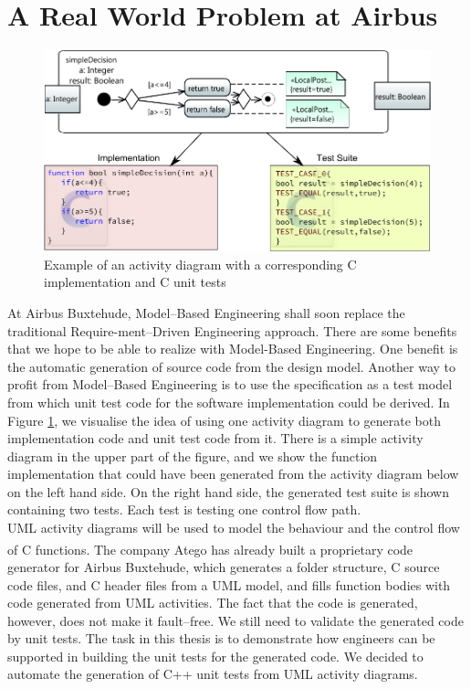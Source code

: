 \section{A Real World Problem at Airbus}
\begin{figure}
\label{fig:Act2Code+Tests}
\includegraphics[width=\textwidth]{./pics/BasicExamplesSimpleDecision.pdf}
\caption{Example of an activity diagram with a corresponding C implementation and C unit tests}
\end{figure}
At Airbus Buxtehude, Model--Based Engineering shall soon replace the traditional Require-ment--Driven Engineering approach. There are some benefits that we hope to be able to realize with Model-Based Engineering. One benefit is the automatic generation of source code from the design model. Another way to profit from Model--Based Engineering is to use the specification as a test model from which unit test code for the software implementation could be derived. In Figure \ref{fig:Act2Code+Tests}, we visualise the idea of using one activity diagram to generate both implementation code and unit test code from it. There is a simple activity diagram in the upper part of the figure, and we show the function implementation that could have been generated from the activity diagram below on the left hand side. On the right hand side, the generated test suite is shown containing two tests. Each test is testing one control flow path.\\
UML activity diagrams will be used to model the behaviour and the control flow of C functions. The company Atego\textsuperscript{\textregistered} has already built a proprietary code generator for Airbus Buxtehude, which generates a folder structure, C source code files, and C header files from a UML model, and fills function bodies with code generated from UML activities. The fact that the code is generated, however, does not make it fault--free. We still need to validate the generated code by unit tests. The task in this thesis is to demonstrate how engineers can be supported in building the unit tests for the generated code. We decided to automate the generation of C++ unit tests from UML activity diagrams.\\
